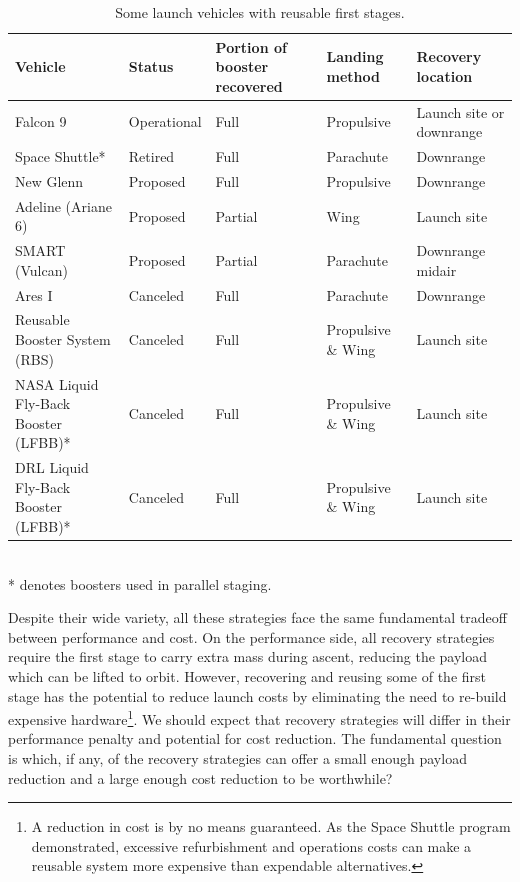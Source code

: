 \documentclass[conf]{new-aiaa}
\begin{document}
\begin{table}[hbt!]
	\caption{\label{tab:vehicles} Some launch vehicles with reusable first stages.}
	\centering
	\begin{tabular}{p{4cm} l p{2cm}  p{2cm} p{2cm}}
		\hline
		Vehicle & Status & Portion of booster recovered & Landing method & Recovery location \\
		\hline
		\hline
		Falcon 9 \cite{Falcon9} & Operational & Full & Propulsive & Launch site or downrange \\
		\hline
		Space Shuttle* & Retired & Full & Parachute & Downrange \\
		\hline
		New Glenn \cite{NewGlenn} & Proposed & Full & Propulsive & Downrange \\
		Adeline (Ariane 6) & Proposed & Partial & Wing & Launch site \\
		SMART (Vulcan) \cite{Ragab2015} & Proposed & Partial & Parachute & Downrange midair \\
		\hline
		Ares I \cite{Ares2009} & Canceled & Full & Parachute & Downrange \\
		Reusable Booster System (RBS) \cite{NAP13534} & Canceled & Full & Propulsive \& Wing & Launch site\\
		NASA Liquid Fly-Back Booster (LFBB)* \cite{Healy1998} & Canceled & Full & Propulsive \& Wing & Launch site\\
		DRL Liquid Fly-Back Booster (LFBB)* \cite{Sippel2003} & Canceled & Full & Propulsive \& Wing & Launch site\\
		\hline
	\end{tabular}
    \\ * denotes boosters used in parallel staging.
\end{table}

Despite their wide variety, all these strategies face the same fundamental tradeoff between performance and cost. On the performance side, all recovery strategies require the first stage to carry extra mass during ascent, reducing the payload which can be lifted to orbit. However, recovering and reusing some of the first stage has the potential to reduce launch costs by eliminating the need to re-build expensive hardware\footnote{A reduction in cost is by no means guaranteed. As the Space Shuttle program demonstrated, excessive refurbishment and operations costs can make a reusable system more expensive than expendable alternatives.}. We should expect that recovery strategies will differ in their performance penalty and potential for cost reduction. The fundamental question is which, if any, of the recovery strategies can offer a small enough payload reduction and a large enough cost reduction to be worthwhile?
\end{document}
